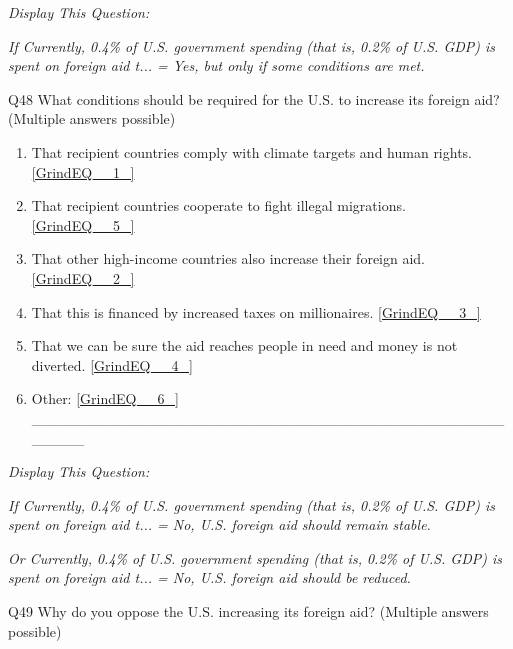 \documentclass{article} %
\begin{document}
\noindent 

\noindent 

\noindent \textit{Display This Question:}

\textit{If Currently, 0.4\% of U.S. government spending (that is, 0.2\% of U.S. GDP) is spent on foreign aid t... = Yes, but only if some conditions are met.}

\noindent 

\noindent Q48 What conditions should be required for the U.S. to increase its foreign aid? (Multiple answers possible)

\begin{enumerate}
\item  That recipient countries comply with climate targets and human rights.  \eqref{GrindEQ__1_} 

\item  That recipient countries cooperate to fight illegal migrations.  \eqref{GrindEQ__5_} 

\item  That other high-income countries also increase their foreign aid.  \eqref{GrindEQ__2_} 

\item  That this is financed by increased taxes on millionaires.  \eqref{GrindEQ__3_} 

\item  That we can be sure the aid reaches people in need and money is not diverted.  \eqref{GrindEQ__4_} 

\item  Other:  \eqref{GrindEQ__6_} \_\_\_\_\_\_\_\_\_\_\_\_\_\_\_\_\_\_\_\_\_\_\_\_\_\_\_\_\_\_\_\_\_\_\_\_\_\_\_\_\_\_\_\_\_\_\_\_\_\_
\end{enumerate}

\noindent 

\noindent 

\noindent \textit{Display This Question:}

\textit{If Currently, 0.4\% of U.S. government spending (that is, 0.2\% of U.S. GDP) is spent on foreign aid t... = No, U.S. foreign aid should remain stable.}

\textit{Or Currently, 0.4\% of U.S. government spending (that is, 0.2\% of U.S. GDP) is spent on foreign aid t... = No, U.S. foreign aid should be reduced.}

\noindent 

\noindent Q49 Why do you oppose the U.S. increasing its foreign aid? (Multiple answers possible)
\end{document}

